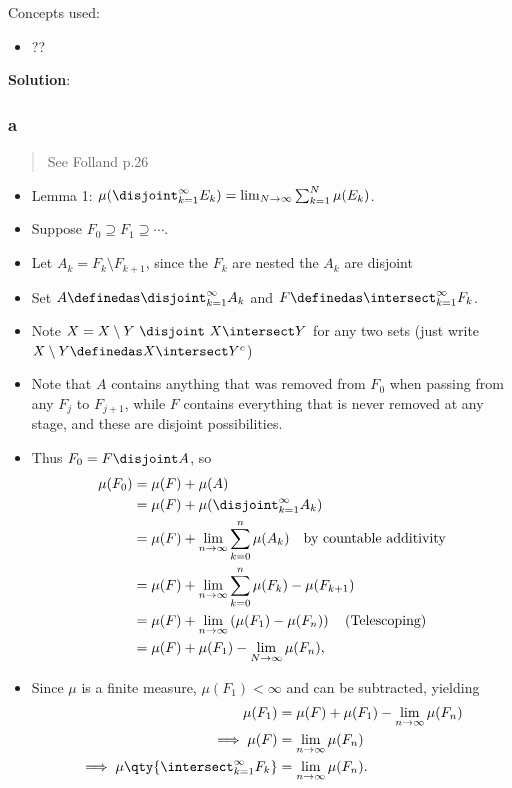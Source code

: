 \begin{solution}

Concepts used:

\begin{itemize}
\tightlist
\item
  ??
\end{itemize}

\textbf{Solution}:

\hypertarget{a-7}{%
\subsubsection{a}\label{a-7}}

\begin{quote}
See Folland p.26
\end{quote}

\begin{itemize}
\item
  Lemma 1:
  \(\mu(\disjoint_{k=1}^\infty E_k) = \lim_{N\to\infty} \sum_{k=1}^N \mu(E_k)\).
\item
  Suppose \(F_0 \supseteq F_1 \supseteq \cdots\).
\item
  Let \(A_k = F_k \setminus F_{k+1}\), since the \(F_k\) are nested the
  \(A_k\) are disjoint
\item
  Set \(A \definedas \disjoint_{k=1}^\infty A_k\) and
  \(F \definedas \intersect_{k=1}^\infty F_k\).
\item
  Note \(X = X\setminus Y ~\disjoint~ X\intersect Y\) for any two sets
  (just write \(X\setminus Y \definedas X\intersect Y^c\))
\item
  Note that \(A\) contains anything that was removed from \(F_0\) when
  passing from any \(F_j\) to \(F_{j+1}\), while \(F\) contains
  everything that is never removed at any stage, and these are disjoint
  possibilities.
\item
  Thus \(F_0 = F \disjoint A\), so
  \begin{align*}
  \mu(F_0) 
  &= \mu(F) + \mu(A) \\
  &= \mu(F) + \mu(\disjoint_{k=1}^\infty A_k) \\
  &= \mu(F) + \lim_{n\to\infty} \sum_{k=0}^n \mu(A_k) \quad \text{by countable additivity}\\
  &= \mu(F) + \lim_{n\to\infty} \sum_{k=0}^n \mu(F_k) - \mu(F_{k+1}) \\
  &= \mu(F) + \lim_{n\to\infty} \left( \mu(F_1) - \mu(F_n) \right) \quad\text{(Telescoping)} \\
  &=\mu(F) + \mu(F_1) - \lim_{N\to\infty} \mu(F_n)
  ,\end{align*}
\item
  Since \(\mu\) is a finite measure, \(\mu(F_1) < \infty\) and can be
  subtracted, yielding
  \begin{align*}
  \mu(F_1) &= \mu(F) + \mu(F_1) - \lim_{n\to\infty} \mu(F_n) \\
  \implies \mu(F) &= \lim_{n\to\infty} \mu(F_n) \\
  \implies \mu\qty{\intersect_{k=1}^\infty F_k} &= \lim_{n\to\infty} \mu(F_n)
  .\end{align*}
\end{itemize}


\end{solution}
